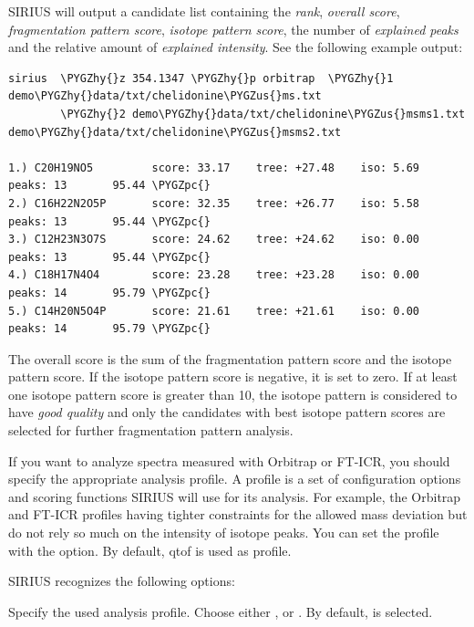 \documentclass[letterpaper,10pt,openany,oneside]{sphinxmanual}
\newcommand\gui[1]{\textsl{\guilsinglleft#1\guilsinglright\xspace}}
\def\PYGZus{\char`\_}
\def\PYGZpc{\char`\%}
\def\PYGZhy{\char`\-}
\begin{document}
SIRIUS will output a candidate list containing the \gui{rank}, \gui{overall score}, \gui{fragmentation pattern score}, \gui{isotope pattern score}, the number of \gui{explained peaks} and the relative amount of \gui{explained intensity}. See the following example output:

\begin{Verbatim}[commandchars=\\\{\}]
sirius  \PYGZhy{}z 354.1347 \PYGZhy{}p orbitrap  \PYGZhy{}1 demo\PYGZhy{}data/txt/chelidonine\PYGZus{}ms.txt
        \PYGZhy{}2 demo\PYGZhy{}data/txt/chelidonine\PYGZus{}msms1.txt demo\PYGZhy{}data/txt/chelidonine\PYGZus{}msms2.txt

1.) C20H19NO5         score: 33.17    tree: +27.48    iso: 5.69       peaks: 13       95.44 \PYGZpc{}
2.) C16H22N2O5P       score: 32.35    tree: +26.77    iso: 5.58       peaks: 13       95.44 \PYGZpc{}
3.) C12H23N3O7S       score: 24.62    tree: +24.62    iso: 0.00       peaks: 13       95.44 \PYGZpc{}
4.) C18H17N4O4        score: 23.28    tree: +23.28    iso: 0.00       peaks: 14       95.79 \PYGZpc{}
5.) C14H20N5O4P       score: 21.61    tree: +21.61    iso: 0.00       peaks: 14       95.79 \PYGZpc{}
\end{Verbatim}

The overall score is the sum of the fragmentation pattern score and the isotope pattern score. If the isotope pattern score is negative, it is set to zero. If at least one isotope pattern score is greater than 10, the isotope pattern is considered to have \emph{good quality} and only the candidates with best isotope pattern scores are selected for further fragmentation pattern analysis.

If you want to analyze spectra measured with Orbitrap or FT-ICR, you should specify the appropriate analysis profile. A profile is a set of configuration options and scoring functions SIRIUS will use for its analysis. For example, the Orbitrap and FT-ICR profiles having tighter constraints for the allowed mass deviation but do not rely so much on the intensity of isotope peaks. You can set the profile with the  option. By default, qtof is used as profile.

SIRIUS recognizes the following options:

\begin{fulllineitems}
\label{commandline:cmdoption-p}
Specify the used analysis profile. Choose either ,  or . By default,  is selected.

\end{fulllineitems}
\end{document}
